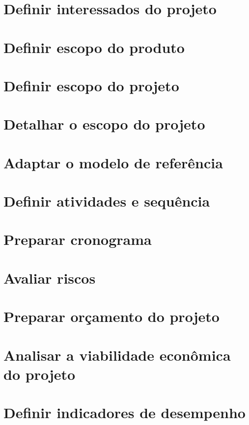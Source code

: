 \documentclass[
	12pt,				%
	openright,			%
	oneside,			%
	a4paper,			%
	english,			%
	french,				%
	spanish,			%
	brazil				%
	]{abntex2}
\begin{document}
\section{Definir interessados do projeto}

\section{Definir escopo do produto}

\section{Definir escopo do projeto}

\section{Detalhar o escopo do projeto}

\section{Adaptar o modelo de referência}

\section{Definir atividades e sequência}

\section{Preparar cronograma}

\section{Avaliar riscos}

\section{Preparar orçamento do projeto}

\section{Analisar a viabilidade econômica do projeto}

\section{Definir indicadores de desempenho}
\end{document}
